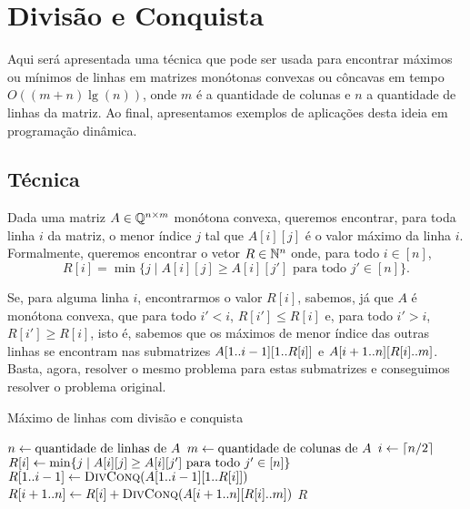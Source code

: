 \section{Divisão e Conquista}
\label{DivisaoEConquista}


Aqui será apresentada uma técnica que pode ser usada para encontrar máximos ou mínimos de linhas em matrizes monótonas convexas ou côncavas em tempo $O((m+n)\lg(n))$, onde $m$ é a quantidade de colunas e $n$ a quantidade de linhas da matriz. Ao final, apresentamos exemplos de aplicações desta ideia em programação dinâmica.  


\subsection{Técnica}
Dada uma matriz $A \in \mathbb{Q}^{n \times m}$ monótona convexa, queremos encontrar, para toda linha $i$ da matriz, o menor índice $j$ tal que $A[i][j]$ é o valor máximo da linha $i$. Formalmente, queremos encontrar o vetor $R \in \mathbb{N}^n$ onde, para todo $i \in [n]$,
$$ R[i] = \min\{j \mid A[i][j] \geq A[i][j'] \text{ para todo } j' \in [n]\} \text{.}$$  

Se, para alguma linha $i$, encontrarmos o valor $R[i]$, sabemos, já que $A$ é monótona convexa, que para todo $i' < i$, $R[i'] \leq R[i]$ e, para todo $i' > i$, $R[i'] \geq R[i]$, isto é, sabemos que os máximos de menor índice das outras linhas se encontram nas submatrizes $A[1 .. i-1][1.. R[i]]$ e $A[i+1.. n][R[i].. m]$. Basta, agora, resolver o mesmo problema para estas submatrizes e conseguimos resolver o problema original. 

\begin{algorithm}[H]
\caption{Máximo de linhas com divisão e conquista}
\label{DivideAndConquer}
\begin{algorithmic}[1]
    \State $n \leftarrow \text{quantidade de linhas de } A$ 
    \State $m \leftarrow \text{quantidade de colunas de } A$ 
    \State $i \leftarrow \lceil n/2\rceil$
    \State $R[i] \leftarrow \min\{j \mid A[i][j] \geq A[i][j'] \text{ para todo } j' \in [n]\}$
        \State $R[1 .. i-1] \leftarrow \textsc{DivConq}(A[1 .. i-1][1 .. R[i]])$           \label{DivideAndConquer:Div_left}
    \EndIf
        \State $R[i+1 .. n] \leftarrow R[i] + \textsc{DivConq}(A[i+1 .. n][R[i] .. m])$    \label{DivideAndConquer:Div_right}
    \EndIf
    \State \Return $R$
\EndFunction
\end{algorithmic}
\end{algorithm}


